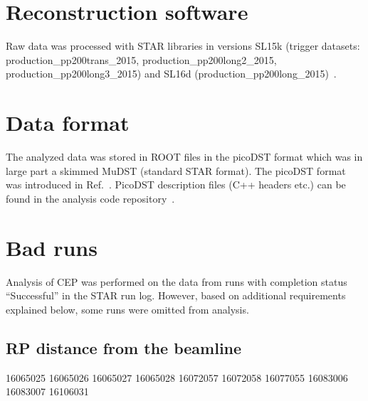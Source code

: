 \section{Reconstruction software}\label{sec:recoSoftware}

Raw data was processed with STAR libraries in versions SL15k (trigger datasets: production\_pp200trans\_2015, production\_pp200long2\_2015, production\_pp200long3\_2015) and SL16d (production\_pp200long\_2015)~\cite{ProductionList}.

\section{Data format}\label{sec:dataFormat}

The analyzed data was stored in ROOT files in the picoDST format which was in large part a skimmed MuDST (standard STAR format). The picoDST format was introduced in Ref.~\cite{PicoDstDescription}. PicoDST description files (C++ headers etc.) can be found in the analysis code repository~\cite{AnalysisCodeRepo}.

\section{Bad runs}\label{sec:badRuns}

Analysis of CEP was performed on the data from runs with completion status ``Successful'' in the STAR run log. However, based on additional requirements explained below, some runs were omitted from analysis.

\subsection{RP distance from the beamline}

16065025
16065026
16065027
16065028
16072057
16072058
16077055
16083006
16083007
16106031


